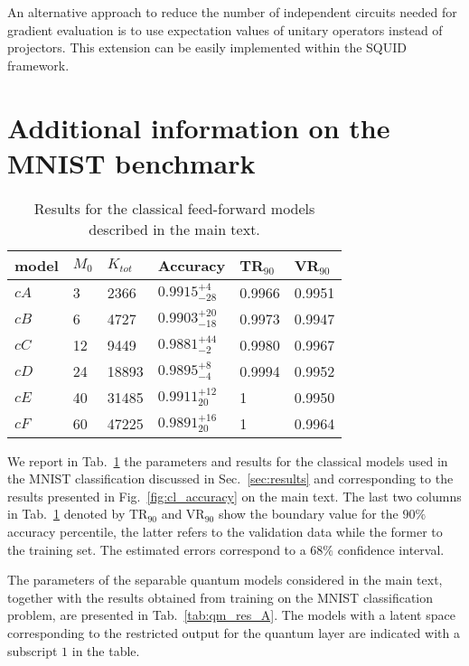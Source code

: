 An alternative approach to reduce the number of independent circuits needed for gradient evaluation is to use expectation values of unitary operators instead of projectors. This extension can be easily implemented within the SQUID framework.

\section{Additional information on the MNIST benchmark}
\label{app:mnist}

\begin{table}[]
\centering
\begin{tabular}{l|l|l|l|l|l}
model & $M_0$ & $K_{tot}$ & Accuracy & TR$_{90}$ & VR$_{90}$\\ \hline
$cA$ & 3 & 2366 & $0.9915^{+4}_{-28}$ & 0.9966 & 0.9951\\
$cB$ & 6 & 4727 & $0.9903^{+20}_{-18}$ & 0.9973 & 0.9947 \\
$cC$ & 12 & 9449 & $0.9881^{+44}_{-2}$ & 0.9980 & 0.9967 \\
$cD$ & 24 & 18893 & $0.9895^{+8}_{-4}$ & 0.9994 & 0.9952 \\
$cE$ & 40 & 31485 & $0.9911^{+12}_{20}$ & 1 & 0.9950 \\
$cF$ & 60 & 47225 & $0.9891^{+16}_{20}$ & 1 & 0.9964
\end{tabular}
\caption{Results for the classical feed-forward models described in the main text. \label{tab:cl_res}}
\end{table}

We report in Tab.~\ref{tab:cl_res} the parameters and results for the classical models used in the MNIST classification discussed in Sec.~\ref{sec:results} and corresponding to the results presented in Fig.~\ref{fig:cl_accuracy} on the main text.
The last two columns in Tab.~\ref{tab:cl_res} denoted by TR$_{90}$ and VR$_{90}$ show the boundary value for the $90\%$ accuracy percentile, the latter refers to the validation data while the former to the training set. The estimated errors correspond to a $68\%$ confidence interval.

The parameters of the separable quantum models considered in the main text, together with the results obtained from training on the MNIST classification problem, are presented in Tab.~\ref{tab:qm_res_A}. The models with a latent space corresponding to the restricted output for the quantum layer are indicated with a subscript $1$ in the table. 


